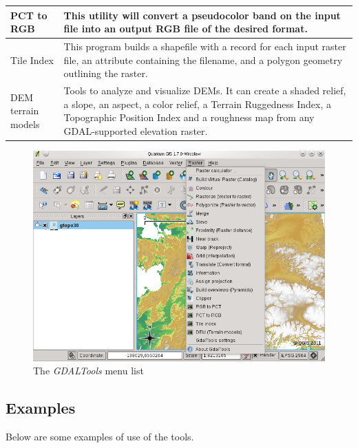 {\begin{longtable}{|p{3cm}|p{13cm}|}
\hline PCT to RGB &  This utility will convert a pseudocolor band on the input file into an output RGB file of the desired format.\\
\hline Tile Index &  This program builds a shapefile with a record for each input raster file, an attribute containing the filename, and a polygon geometry outlining the raster.\\
\hline DEM terrain models &  Tools to analyze and visualize DEMs. It can create  a shaded relief, a slope, an aspect, a color relief, a Terrain Ruggedness Index, a  Topographic Position Index and a roughness map from any GDAL-supported elevation raster.\\
\hline
\end{longtable}

\begin{figure}[ht]
   \centering
   \caption{The \emph{GDALTools} menu list \nixcaption}\label{gdaltools_menu}
   \includegraphics[clip=true, width=12cm]{plugins_gdaltools_images/raster_menu}
\end{figure}

\subsection{Examples}\label{gdal_examples}
Below are some examples of use of the tools.
}
